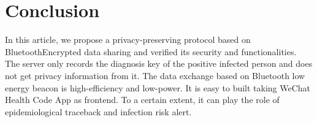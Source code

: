 \documentclass[11pt,en]{elegantpaper}
\begin{document}
\section{Conclusion}
In this article, we propose a privacy-preserving protocol based on BluetoothEncrypted data sharing and verified its security and functionalities. The server only records the diagnosis key of the positive infected person and does not get privacy information from it. The data exchange based on Bluetooth low energy beacon is high-efficiency and low-power. It is easy to built taking WeChat Health Code App as frontend. To a certain extent, it can play the role of epidemiological traceback and infection risk alert.

\end{document}
